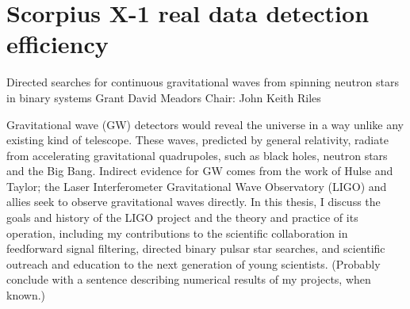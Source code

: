 \documentclass[leqno,twoside]{report}
\theoremstyle{plain}
\theoremstyle{definition}
\theoremstyle{remark}
\numberwithin{theorem}{chapter}        %
\begin{document}
\chapter{Scorpius X-1 real data detection efficiency}
\label{appendix2}





\startabstractpage
{Directed searches for continuous gravitational waves from spinning neutron stars in binary systems } {Grant David Meadors} {Chair: John Keith Riles}

Gravitational wave (GW) detectors would reveal the universe in a way unlike any existing kind of telescope. These waves, predicted by general relativity, radiate from accelerating gravitational quadrupoles, such as black holes, neutron stars and the Big Bang. Indirect evidence for GW comes from the work of Hulse and Taylor; the Laser Interferometer Gravitational Wave Observatory (LIGO) and allies seek to observe gravitational waves directly. In this thesis, I discuss the goals and history of the LIGO project and the theory and practice of its operation, including my contributions to the scientific collaboration in feedforward signal filtering, directed binary pulsar star searches, and scientific outreach and education to the next generation of young scientists. (Probably conclude with a sentence describing numerical results of my projects, when known.)
\end{document}
